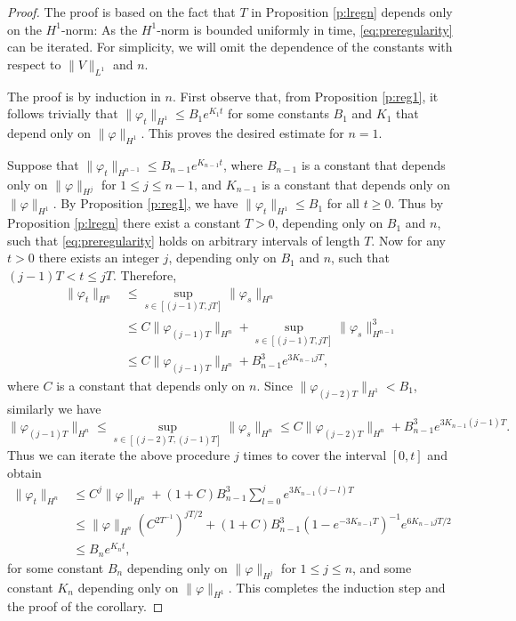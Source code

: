 \documentclass[11pt,a4paper,draft,DIV11]{scrartcl}	%
\begin{document}
\begin{proof}
The proof is based on the fact that $T$ in Proposition \ref{p:lregn} depends only on the $H^1$-norm: As the $H^1$-norm is bounded uniformly in time, \eqref{eq:preregularity} can be iterated. 
  For simplicity, we will omit the dependence of the constants with respect
  to $\| V \|_{L^1}$ and $n$.

  The proof is by induction in $n$. First observe that, from Proposition
  \ref{p:reg1}, it follows trivially that $\| \varphi_t \|_{H^1} \le B_1
  e^{K_1 t}$ for some constants $B_1$ and $K_1$ that depend only on $\|
  \varphi \|_{H^1}$. This proves the desired estimate for $n=1$.

  Suppose that $\| \varphi_t \|_{H^{n-1}} \le B_{n-1} e^{K_{n-1} t}$, where
  $B_{n-1}$ is a constant that depends only on $\| \varphi \|_{H^j}$ for $1
  \le j \le n-1$, and $K_{n-1}$ is a constant that depends only on $\|
  \varphi \|_{H^1}$. By Proposition \ref{p:reg1}, we have $\| \varphi_t
  \|_{H^1} \le B_1$ for all $t \ge 0$.
%
 Thus by Proposition \ref{p:lregn} there exist a constant $T>0$, depending 
  only on $B_1$ and $n$, such that \eqref{eq:preregularity} holds on arbitrary intervals of length $T$. Now for
 any $t > 0$ there exists an integer $j$, depending
  only on $B_1$ and $n$, such that $(j-1)T < t \le jT$. Therefore,
%
  \begin{align*}
    \| \varphi_t \|_{H^n} & \le \sup_{s \in [(j-1)T, jT]} \| \varphi_s
    \|_{H^n} \\
    & \le C \| \varphi_{(j-1)T} \|_{H^n} + \sup_{s \in [(j-1)T, jT]} \|
    \varphi_s \|_{H^{n-1}}^3 \\
    & \le C \| \varphi_{(j-1)T} \|_{H^n} + B_{n-1}^3 e^{3 K_{n-1} j T},
  \end{align*}
  where $C$ is a constant that depends only on $n$. Since $\|
  \varphi_{(j-2)T} \|_{H^1} < B_1$, similarly we have
  \[
    \| \varphi_{(j-1)T} \|_{H^n} \le \sup_{s \in [(j-2)T, (j-1)T]} \|
    \varphi_s \|_{H^n} \le C \|
    \varphi_{(j-2)T} \|_{H^n} + B_{n-1}^3 e^{3 K_{n-1} (j-1)T}.
  \]
  Thus we can iterate the above procedure $j$ times to cover the interval
  $[0,t]$ and obtain
  \begin{align*}
    \| \varphi_t \|_{H^n} & \le C^j \| \varphi \|_{H^n} + (1+C) B_{n-1}^3
    \sum_{l=0}^j e^{3 K_{n-1} (j-l)T} \\
    & \le \| \varphi \|_{H^n} (C^{2 T^{-1}})^{jT/2} + (1+C) B_{n-1}^3
    (1-e^{-3K_{n-1} T})^{-1} e^{6 K_{n-1} jT/2} \\
    & \le B_n e^{K_n t},
  \end{align*}
  for some constant $B_n$ depending only on $\| \varphi \|_{H^j}$ for $1 \le
  j \le n$, and some constant $K_n$ depending only on $\| \varphi \|_{H^1}$.
  This completes the induction step and the proof of the corollary.
\end{proof}
\end{document}
